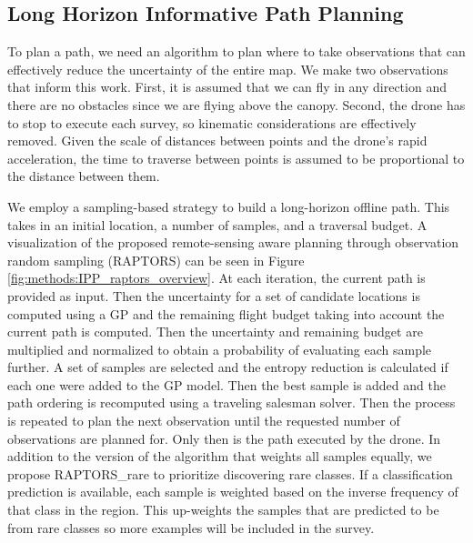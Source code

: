  
\subsection{Long Horizon Informative Path Planning}
To plan a path, we need an algorithm to plan where to take observations that can effectively reduce the uncertainty of the entire map. We make two observations that inform this work. First, it is assumed that we can fly in any direction and there are no obstacles since we are flying above the canopy. Second, the drone has to stop to execute each survey, so kinematic considerations are effectively removed. Given the scale of distances between points and the drone's rapid acceleration, the time to traverse between points is assumed to be proportional to the distance between them.  

We employ a sampling-based strategy to build a long-horizon offline path. This takes in an initial location, a number of samples, and a traversal budget. A visualization of the proposed remote-sensing aware planning through observation random sampling (RAPTORS) can be seen in Figure \ref{fig:methods:IPP_raptors_overview}.
At each iteration, the current path is provided as input. Then the uncertainty for a set of candidate locations is computed using a GP and the remaining flight budget taking into account the current path is computed. Then the uncertainty and remaining budget are multiplied and normalized to obtain a probability of evaluating each sample further. A set of samples are selected and the entropy reduction is calculated if each one were added to the GP model. Then the best sample is added and the path ordering is recomputed using a traveling salesman solver. Then the process is repeated to plan the next observation until the requested number of observations are planned for. Only then is the path executed by the drone. In addition to the version of the algorithm that weights all samples equally, we propose RAPTORS\_rare to prioritize discovering rare classes. If a classification prediction is available, each sample is weighted based on the inverse frequency of that class in the region. This up-weights the samples that are predicted to be from rare classes so more examples will be included in the survey.
